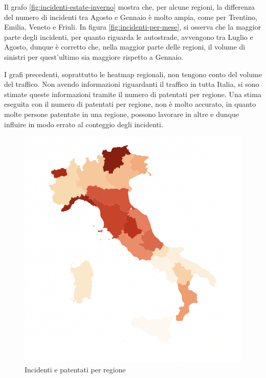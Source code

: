 \documentclass[a4paper]{report}
\begin{document}
Il grafo \ref{fig:incidenti-estate-inverno} mostra che, per alcune regioni, la differenza del  
numero di incidenti tra Agosto e Gennaio è molto ampia, come per Trentino, Emilia, Veneto e Friuli.
In figura \ref{fig:incidenti-per-mese}, si osserva che la maggior parte degli incidenti, 
per quanto riguarda le autostrade, avvengono tra Luglio e Agosto, dunque è corretto che,  
nella maggior parte delle regioni, il volume di sinistri per quest'ultimo sia maggiore rispetto a Gennaio. 

I grafi precedenti, soprattutto le heatmap regionali, non tengono conto del volume del traffico.
Non avendo informazioni riguardanti il traffico in tutta Italia, si sono stimate queste informazioni 
tramite il numero di patentati per regione.
Una stima eseguita con il numero di patentati per regione, non è molto accurato, 
in quanto molte persone patentate in una regione, possono lavorare in altre e dunque influire 
in modo errato al conteggio degli incidenti. 

\begin{figure}
    \includegraphics[width=\linewidth]{../src/incidenti/incidenti_aci/mappe_regioni/incidenti_patenti.png}
    \caption{Incidenti e patentati per regione}
    \label{fig:incidenti-patentati}
\end{figure}
\end{document}
